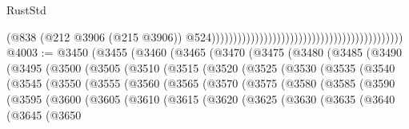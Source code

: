 \begin{lexlean}{RustStd}
\begin{coremodule}
                                                                                          (@838
                                                                                            (@212
                                                                                              @3906
                                                                                              (@215
                                                                                                @3906))
                                                                                            @524))))))))))))))))))))))))))))))))))))))))))))
@4003 := @3450
    (@3455
      (@3460
        (@3465
          (@3470
            (@3475
              (@3480
                (@3485
                  (@3490
                    (@3495
                      (@3500
                        (@3505
                          (@3510
                            (@3515
                              (@3520
                                (@3525
                                  (@3530
                                    (@3535
                                      (@3540
                                        (@3545
                                          (@3550
                                            (@3555
                                              (@3560
                                                (@3565
                                                  (@3570
                                                    (@3575
                                                      (@3580
                                                        (@3585
                                                          (@3590
                                                            (@3595
                                                              (@3600
                                                                (@3605
                                                                  (@3610
                                                                    (@3615
                                                                      (@3620
                                                                        (@3625
                                                                          (@3630
                                                                            (@3635
                                                                              (@3640
                                                                                (@3645
                                                                                  (@3650

\end{coremodule}
\end{lexlean}
